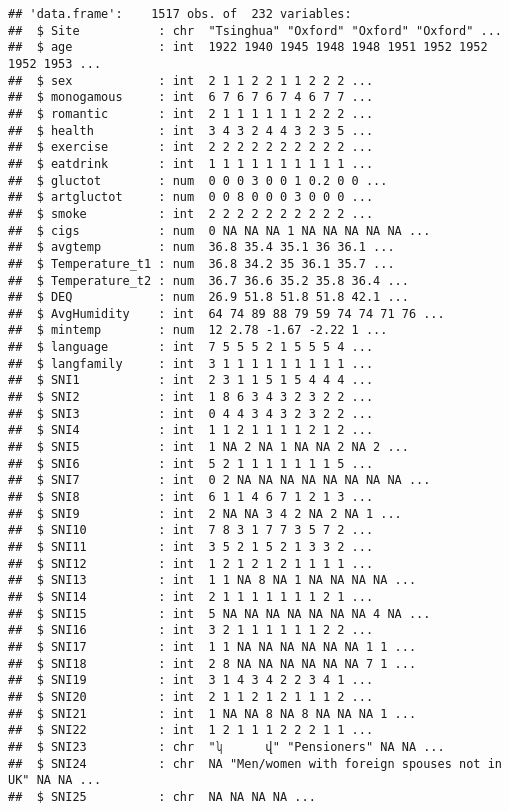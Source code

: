 \documentclass[
]{article}
\begin{document}
\begin{verbatim}
## 'data.frame':    1517 obs. of  232 variables:
##  $ Site           : chr  "Tsinghua" "Oxford" "Oxford" "Oxford" ...
##  $ age            : int  1922 1940 1945 1948 1948 1951 1952 1952 1952 1953 ...
##  $ sex            : int  2 1 1 2 2 1 1 2 2 2 ...
##  $ monogamous     : int  6 7 6 7 6 7 4 6 7 7 ...
##  $ romantic       : int  2 1 1 1 1 1 1 2 2 2 ...
##  $ health         : int  3 4 3 2 4 4 3 2 3 5 ...
##  $ exercise       : int  2 2 2 2 2 2 2 2 2 2 ...
##  $ eatdrink       : int  1 1 1 1 1 1 1 1 1 1 ...
##  $ gluctot        : num  0 0 0 3 0 0 1 0.2 0 0 ...
##  $ artgluctot     : num  0 0 8 0 0 0 3 0 0 0 ...
##  $ smoke          : int  2 2 2 2 2 2 2 2 2 2 ...
##  $ cigs           : num  0 NA NA NA 1 NA NA NA NA NA ...
##  $ avgtemp        : num  36.8 35.4 35.1 36 36.1 ...
##  $ Temperature_t1 : num  36.8 34.2 35 36.1 35.7 ...
##  $ Temperature_t2 : num  36.7 36.6 35.2 35.8 36.4 ...
##  $ DEQ            : num  26.9 51.8 51.8 51.8 42.1 ...
##  $ AvgHumidity    : int  64 74 89 88 79 59 74 74 71 76 ...
##  $ mintemp        : num  12 2.78 -1.67 -2.22 1 ...
##  $ language       : int  7 5 5 5 2 1 5 5 5 4 ...
##  $ langfamily     : int  3 1 1 1 1 1 1 1 1 1 ...
##  $ SNI1           : int  2 3 1 1 5 1 5 4 4 4 ...
##  $ SNI2           : int  1 8 6 3 4 3 2 3 2 2 ...
##  $ SNI3           : int  0 4 4 3 4 3 2 3 2 2 ...
##  $ SNI4           : int  1 1 2 1 1 1 1 2 1 2 ...
##  $ SNI5           : int  1 NA 2 NA 1 NA NA 2 NA 2 ...
##  $ SNI6           : int  5 2 1 1 1 1 1 1 1 5 ...
##  $ SNI7           : int  0 2 NA NA NA NA NA NA NA NA ...
##  $ SNI8           : int  6 1 1 4 6 7 1 2 1 3 ...
##  $ SNI9           : int  2 NA NA 3 4 2 NA 2 NA 1 ...
##  $ SNI10          : int  7 8 3 1 7 7 3 5 7 2 ...
##  $ SNI11          : int  3 5 2 1 5 2 1 3 3 2 ...
##  $ SNI12          : int  1 2 1 2 1 2 1 1 1 1 ...
##  $ SNI13          : int  1 1 NA 8 NA 1 NA NA NA NA ...
##  $ SNI14          : int  2 1 1 1 1 1 1 1 2 1 ...
##  $ SNI15          : int  5 NA NA NA NA NA NA NA 4 NA ...
##  $ SNI16          : int  3 2 1 1 1 1 1 1 2 2 ...
##  $ SNI17          : int  1 1 NA NA NA NA NA NA 1 1 ...
##  $ SNI18          : int  2 8 NA NA NA NA NA NA 7 1 ...
##  $ SNI19          : int  3 1 4 3 4 2 2 3 4 1 ...
##  $ SNI20          : int  2 1 1 2 1 2 1 1 1 2 ...
##  $ SNI21          : int  1 NA NA 8 NA 8 NA NA NA 1 ...
##  $ SNI22          : int  1 2 1 1 1 2 2 2 1 1 ...
##  $ SNI23          : chr  "ʮ      վ" "Pensioners" NA NA ...
##  $ SNI24          : chr  NA "Men/women with foreign spouses not in UK" NA NA ...
##  $ SNI25          : chr  NA NA NA NA ...

\end{verbatim}
\end{document}
